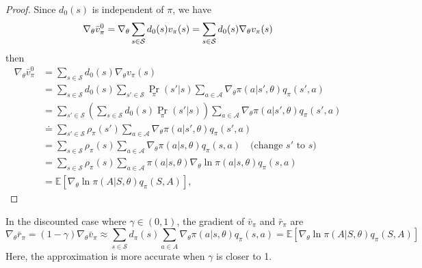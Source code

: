 \documentclass[10pt]{elegantbook}
\begin{document}
\begin{proof}
    Since $d_0(s)$ is independent of $\pi$, we have
    \[
        \nabla_{\theta}\bar{v}_{\pi}^{0}=\nabla_{\theta}\sum_{s\in{\cal S}}d_{0}(s)v_{\pi}(s)=\sum_{s\in{\cal S}}d_{0}(s)\nabla_{\theta}v_{\pi}(s)
    \]
    then
    \[
    \begin{aligned}
    \nabla_{\theta} \bar{v}_{\pi}^{0} 
    &= \sum_{s \in \mathcal{S}} d_0(s) \nabla_{\theta} v_{\pi}(s) \\
    &= \sum_{s \in \mathcal{S}} d_0(s) \sum_{s' \in \mathcal{S}} \Pr_{\pi}(s'|s) \sum_{a \in \mathcal{A}} \nabla_{\theta} \pi(a|s', \theta) q_{\pi}(s', a) \\
    &= \sum_{s' \in \mathcal{S}} \left( \sum_{s \in \mathcal{S}} d_0(s) \Pr_{\pi}(s'|s) \right) \sum_{a \in \mathcal{A}} \nabla_{\theta} \pi(a|s', \theta) q_{\pi}(s', a) \\
    &\doteq \sum_{s' \in \mathcal{S}} \rho_{\pi}(s') \sum_{a \in \mathcal{A}} \nabla_{\theta} \pi(a|s', \theta) q_{\pi}(s', a) \\
    &= \sum_{s \in \mathcal{S}} \rho_{\pi}(s) \sum_{a \in \mathcal{A}} \nabla_{\theta} \pi(a|s, \theta) q_{\pi}(s, a) \quad \text{(change $s'$ to $s$)} \\
    &= \sum_{s \in \mathcal{S}} \rho_{\pi}(s) \sum_{a \in \mathcal{A}} \pi(a|s, \theta) \nabla_{\theta} \ln \pi(a|s, \theta) q_{\pi}(s, a) \\
    &= \mathbb{E}\left[ \nabla_{\theta} \ln \pi(A|S, \theta) q_{\pi}(S, A) \right],
    \end{aligned}
    \]
\end{proof}

\begin{theorem}
    In the discounted case where $\gamma \in (0, 1)$, the gradient of $\bar v_{\pi}$ and $\bar r_{\pi}$ are
    \begin{equation}
        \nabla_{\theta}\bar{r}_{\pi}=(1-\gamma)\nabla_{\theta}\bar{v}_{\pi}
        \approx
        \sum_{s\in{\mathcal{S}}}d_{\pi}(s)\sum_{a\in A}\nabla_{\theta}\pi(a|s,\theta)q_{\pi}(s,a)
        =\mathbb{E}\left[\nabla_{\theta}\ln\pi(A|S,\theta)q_{\pi}(S,A)\right]
    \end{equation}
    Here, the approximation is more accurate when $\gamma$ is closer to 1.
\end{theorem}
\end{document}
